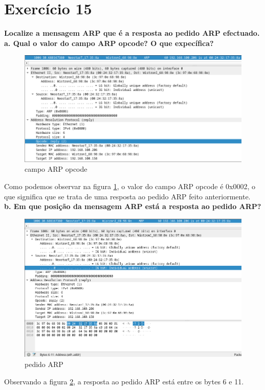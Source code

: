 \documentclass[a4paper]{report}
\begin{document}
\section{Exercício 15}
\textbf{Localize a mensagem ARP que é a resposta ao pedido ARP efectuado.}\\
\textbf{a. Qual o valor do campo ARP opcode? O que expecífica?}
\begin{figure}[H]
    \centering 
    \includegraphics[width=\textwidth]{images/ex15a.png}
    \caption{campo ARP opcode}
    \label{fig:ex15a}
\end{figure}
Como podemos observar na figura \ref{fig:ex15a}, o valor do campo ARP opcode é
0x0002, o que significa que se trata de uma resposta ao pedido ARP feito
anteriormente.\\
\textbf{b. Em que posição da mensagem ARP está a resposta ao pedido ARP?}

\begin{figure}[H]
    \centering 
    \includegraphics[width=\textwidth]{images/ex15b.png}
    \caption{pedido ARP}
    \label{fig:ex15b}
\end{figure}
Observando a figura \ref{fig:ex15b}, a resposta ao pedido ARP está entre os
bytes 6 e 11.
\end{document}
